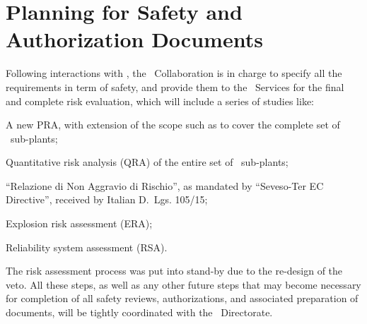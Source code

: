 \section{Planning for Safety and Authorization Documents}
\label{sec:Safety}

Following interactions with \LNGS, the \DSs\ Collaboration is in charge to specify all the requirements in term of safety, and provide them to the \LNGS\ Services for the final and complete risk evaluation, which will include a series of studies like:
\begin{compactitem}
\item A new PRA, with extension of the scope such as to cover the complete set of \DSk\ sub-plants;
\item Quantitative risk analysis (QRA) of the entire set of \DSk\ sub-plants;
\item ``Relazione di Non Aggravio di Rischio'', as mandated by ``Seveso-Ter EC Directive'', received by Italian D.~Lgs. 105/15;
\item Explosion risk assessment (ERA);
\item Reliability system assessment (RSA).
\end{compactitem}

The risk assessment process was put into stand-by due to the re-design of the veto.  All these steps, as well as any other future steps that may become necessary for completion of all safety reviews, authorizations, and associated preparation of documents, will be tightly coordinated with the \LNGS\ Directorate.